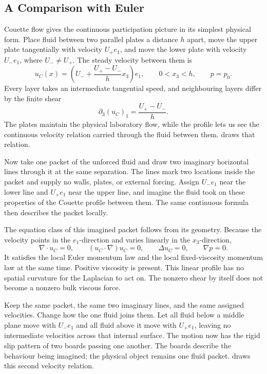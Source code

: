 \subsection{A Comparison with Euler}\label{sub:AComparisonWithEuler}

Couette flow gives the continuous participation picture in its simplest physical form.
Place fluid between two parallel plates a distance \(h\) apart, move the upper plate tangentially with velocity \(U_+e_1\), and move the lower plate with velocity \(U_-e_1\), where \(U_-\neq U_+\).
The steady velocity between them is
\[
  u_C(x)
  =
  \left(
    U_-+\frac{U_+-U_-}{h}x_3
  \right)e_1,
  \qquad
  0<x_3<h,
  \qquad
  p=p_0.
\]
Every layer takes an intermediate tangential speed, and neighbouring layers differ by the finite shear
\[
  \partial_3(u_C)_1
  =
  \frac{U_+-U_-}{h}.
\]
The plates maintain the physical laboratory flow, while the profile lets us see the continuous velocity relation carried through the fluid between them.
 draws that relation.



Now take one packet of the unforced fluid and draw two imaginary horizontal lines through it at the same separation.
The lines mark two locations inside the packet and supply no walls, plates, or external forcing.
Assign \(U_-e_1\) near the lower line and \(U_+e_1\) near the upper line, and imagine the fluid took on these properties of the Couette profile between them.
The same continuous formula then describes the packet locally.

The equation class of this imagined packet follows from its geometry.
Because the velocity points in the \(e_1\)-direction and varies linearly in the \(x_3\)-direction,
\[
  \nabla\cdot u_C=0,
  \qquad
  (u_C\cdot\nabla)u_C=0,
  \qquad
  \Delta u_C=0,
  \qquad
  \nabla p=0.
\]
It satisfies the local Euler momentum law and the local fixed-viscosity \NavierStokes{} momentum law at the same time.
Positive viscosity is present.
This linear profile has no spatial curvature for the Laplacian to act on.
The nonzero shear by itself does not become a nonzero bulk viscous force.

Keep the same packet, the same two imaginary lines, and the same assigned velocities.
Change how the one fluid joins them.
Let all fluid below a middle plane move with \(U_-e_1\) and all fluid above it move with \(U_+e_1\), leaving no intermediate velocities across that internal surface.
The motion now has the rigid slip pattern of two boards passing one another.
The boards describe the behaviour being imagined; the physical object remains one fluid packet.
 draws this second velocity relation.


